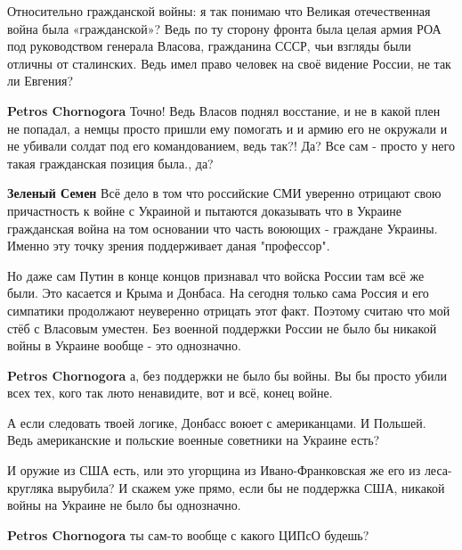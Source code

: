 \begin{itemize}
Относительно гражданской войны: я так понимаю что Великая отечественная война
была «гражданской»? Ведь по ту сторону фронта была целая армия РОА под
руководством генерала Власова, гражданина СССР, чьи взгляды были отличны от
сталинских. Ведь имел право человек на своё видение России, не так ли Евгения?

\begin{itemize}

\textbf{Petros Chornogora} Точно! Ведь Власов поднял восстание, и не в какой
плен не попадал, а немцы просто пришли ему помогать и и армию его не окружали и
не убивали солдат под его командованием, ведь так?! Да? Все сам - просто у него
такая гражданская позиция была., да?



\textbf{Зеленый Семен} Всё дело в том что российские СМИ уверенно отрицают свою
причастность к войне с Украиной и пытаются доказывать что в Украине гражданская
война на том основании что часть воюющих - граждане Украины. Именно эту точку
зрения поддерживает даная "профессор".

Но даже сам Путин в конце концов признавал что войска России там всё же были.
Это касается и Крыма и Донбаса. На сегодня только сама Россия и его симпатики
продолжают неуверенно отрицать этот факт. Поэтому считаю что мой стёб с
Власовым уместен.  Без военной поддержки России не было бы никакой войны в
Украине вообще - это однозначно.



\textbf{Petros Chornogora} а, без поддержки не было бы войны. Вы бы просто убили всех тех, кого так люто ненавидите, вот и всё, конец войне.

А если следовать твоей логике, Донбасс воюет с американцами.  И Польшей. Ведь
американские и польские военные советники на Украине есть? 

И оружие из США есть, или это угорщина из Ивано-Франковская же его из
леса-кругляка вырубила? И скажем уже прямо, если бы не поддержка США, никакой
войны на Украине не было бы однозначно.


\textbf{Petros Chornogora} ты сам-то вообще с какого ЦИПсО будешь?


\end{itemize}
\end{itemize}
